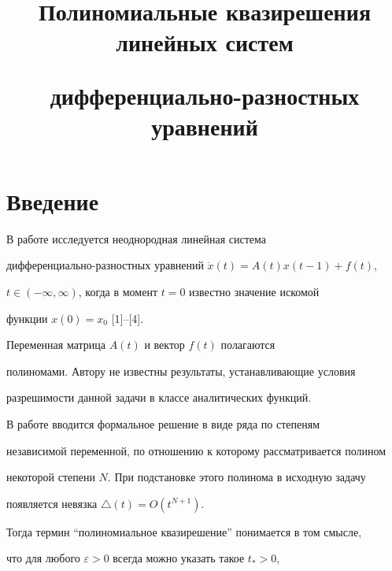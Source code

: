 

\title{Полиномиальные квазирешения линейных систем


дифференциально-разностных уравнений}





\date{}




\pagestyle{plain} %







\maketitle





\section {Введение}





В работе исследуется неоднородная линейная система


дифференциально-разност\-ных уравнений $\Dot{x}(t)=A(t)x(t-1)+f(t)$,


$t\in (-\infty, \infty)$, когда в момент $t=0$ известно значение искомой


функции $x(0)=x_{0}$ [1]--[4].


Переменная матрица $A(t)$ и вектор $f(t)$ полагаются


полиномами. Автору  не известны  результаты, устанавливающие условия


разрешимости данной задачи в  классе аналитических функций.


В работе вводится формальное решение в виде ряда по степеням


независимой переменной, по отношению к которому рассматривается полином


некоторой степени $N$. При подстановке этого полинома в исходную задачу


появляется невязка $\triangle (t)= O(t^{N+1})$.


Тогда термин ``полиномиальное квазирешение'' понимается в том смысле,


что для любого $\varepsilon >0$ всегда можно указать такое $t_{*}>0$,



